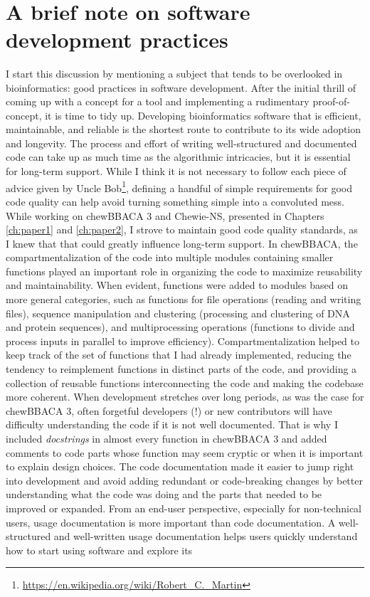 \renewcommand*{\thefootnote}{\arabic{footnote}}

\mbox{}\\
\vspace{8cm}

\section{A brief note on software development practices}

I start this discussion by mentioning a subject that tends to be overlooked in bioinformatics: good practices in software development. After the initial thrill of coming up with a concept for a tool and implementing a rudimentary proof-of-concept, it is time to tidy up. Developing bioinformatics software that is efficient, maintainable, and reliable is the shortest route to contribute to its wide adoption and longevity. The process and effort of writing well-structured and documented code can take up as much time as the algorithmic intricacies, but it is essential for long-term support. While I think it is not necessary to follow each piece of advice given by Uncle Bob\footnote{\url{https://en.wikipedia.org/wiki/Robert_C._Martin}}, defining a handful of simple requirements for good code quality can help avoid turning something simple into a convoluted mess. While working on chewBBACA 3 and Chewie-NS, presented in Chapters \ref{ch:paper1} and \ref{ch:paper2}, I strove to maintain good code quality standards, as I knew that that could greatly influence long-term support. In chewBBACA, the compartmentalization of the code into multiple modules containing smaller functions played an important role in organizing the code to maximize reusability and maintainability. When evident, functions were added to modules based on more general categories, such as functions for file operations (reading and writing files), sequence manipulation and clustering (processing and clustering of DNA and protein sequences), and multiprocessing operations (functions to divide and process inputs in parallel to improve efficiency). Compartmentalization helped to keep track of the set of functions that I had already implemented, reducing the tendency to reimplement functions in distinct parts of the code, and providing a collection of reusable functions interconnecting the code and making the codebase more coherent. When development stretches over long periods, as was the case for chewBBACA 3, often forgetful developers (!) or new contributors will have difficulty understanding the code if it is not well documented. That is why I included \textit{docstrings} in almost every function in chewBBACA 3 and added comments to code parts whose function may seem cryptic or when it is important to explain design choices. The code documentation made it easier to jump right into development and avoid adding redundant or code-breaking changes by better understanding what the code was doing and the parts that needed to be improved or expanded. From an end-user perspective, especially for non-technical users, usage documentation is more important than code documentation. A well-structured and well-written usage documentation helps users quickly understand how to start using software and explore its 